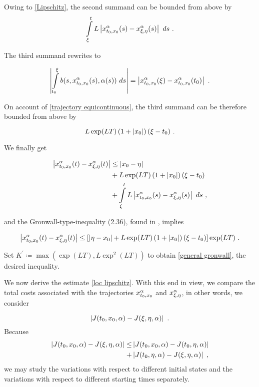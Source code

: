 Owing to \eqref{Lipschitz}, the second summand can be bounded from above by
\begin{equation*}
	\int\limits_{\xi}^{t} L \normof{\trajectory{t_0}{x_0}(s) - \trajectory{\xi}{\eta}(s)} \ ds \ .
\end{equation*}

The third summand rewrites to

\begin{equation*}
	\normof{\dynint{t_0}{\xi}{\trajectory{t_0}{x_0}}} = \normof{\trajectory{t_0}{x_0}(\xi) - \trajectory{t_0}{x_0}(t_0)} \ .
\end{equation*}

On account of \eqref{trajectory equicontinuous}, the third summand can be therefore bounded from above by

\begin{equation*}
	L \exp(LT) \left(1 + \left\lvert {x_0} \right\rvert \right) (\xi - t_0) \ .
\end{equation*}

We finally get

\begin{equation*}
	\begin{split}
	\left\lvert {x_{t_0, x_0}^{\alpha}(t) - x_{\xi, \eta}^{\alpha}(t)} \right\rvert &\leq \left\lvert {x_0 - \eta } \right\rvert \\
	&+ L \exp(LT) \left(1 + \left\lvert {x_0} \right\rvert \right) (\xi - t_0) \\
	&+ 	\int\limits_{\xi}^{t} L \left\lvert {x_{t_0, x_0}^{\alpha}(s) - x_{\xi, \eta}^{\alpha}(s)} \right\rvert \ ds \ ,
	\end{split}
\end{equation*}

and the Gronwall-type-inequality (2.36), found in \cite[p.~42]{teschl2012ordinary}, implies

\begin{multline*}
	\left\lvert {x_{t_0, x_0}^{\alpha}(t) - x_{\xi, \eta}^{\alpha}(t)} \right\rvert \leq \left[ \left\lvert {\eta - x_0} \right\rvert + L \exp(LT) \left(1 + \left\lvert {x_0} \right\rvert \right) (\xi - t_0) \right] \exp(LT) \ .
\end{multline*}

Set $ K^{\prime} \coloneqq \max \left(\exp(LT), L \exp^2(LT) \right) $ to obtain \eqref{general gronwall}, the desired inequality.

We now derive the estimate \eqref{loc lipschitz}. With this end in view, we compare the total costs associated with the trajectories $ x_{t_0, x_0}^{\alpha} $ and $ x_{\xi, \eta}^{\alpha} $, in other words, we consider

\begin{equation*}
	\left\lvert {J(t_0, x_0, \alpha) - J(\xi, \eta, \alpha)} \right\rvert \ .
\end{equation*}
Because
\begin{align*}
	\left\lvert {J(t_0, x_0, \alpha) - J(\xi, \eta, \alpha)} \right\rvert \leq &\left\lvert {J(t_0, x_0, \alpha) - J(t_0, \eta, \alpha)} \right\rvert \\ 
	+ &\left\lvert {J(t_0, \eta, \alpha) - J(\xi, \eta, \alpha)} \right\rvert \ ,
\end{align*}
we may study the variations with respect to different initial states and the variations with respect to different starting times separately.

